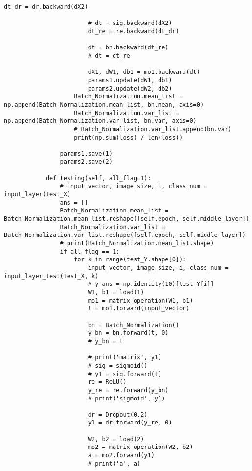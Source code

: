 \documentclass[a4j, titlepage]{jarticle}
\begin{document}
\begin{lstlisting}[caption=3層ニューラルネットワークの構成 ,label=fuga]
                        dt_dr = dr.backward(dX2)

                        # dt = sig.backward(dX2)
                        dt_re = re.backward(dt_dr)

                        dt = bn.backward(dt_re)
                        # dt = dt_re

                        dX1, dW1, db1 = mo1.backward(dt)
                        params1.update(dW1, db1)
                        params2.update(dW2, db2)
                    Batch_Normalization.mean_list = np.append(Batch_Normalization.mean_list, bn.mean, axis=0)
                    Batch_Normalization.var_list = np.append(Batch_Normalization.var_list, bn.var, axis=0)
                    # Batch_Normalization.var_list.append(bn.var)
                    print(np.sum(loss) / len(loss))

                params1.save(1)
                params2.save(2)

            def testing(self, all_flag=1):
                # input_vector, image_size, i, class_num = input_layer(test_X)
                ans = []
                Batch_Normalization.mean_list = Batch_Normalization.mean_list.reshape([self.epoch, self.middle_layer])
                Batch_Normalization.var_list = Batch_Normalization.var_list.reshape([self.epoch, self.middle_layer])
                # print(Batch_Normalization.mean_list.shape)
                if all_flag == 1:
                    for k in range(test_Y.shape[0]):
                        input_vector, image_size, i, class_num = input_layer_test(test_X, k)
                        # y_ans = np.identity(10)[test_Y[i]]
                        W1, b1 = load(1)
                        mo1 = matrix_operation(W1, b1)
                        t = mo1.forward(input_vector)

                        bn = Batch_Normalization()
                        y_bn = bn.forward(t, 0)
                        # y_bn = t

                        # print('matrix', y1)
                        # sig = sigmoid()
                        # y1 = sig.forward(t)
                        re = ReLU()
                        y_re = re.forward(y_bn)
                        # print('sigmoid', y1)

                        dr = Dropout(0.2)
                        y1 = dr.forward(y_re, 0)

                        W2, b2 = load(2)
                        mo2 = matrix_operation(W2, b2)
                        a = mo2.forward(y1)
                        # print('a', a)


\end{lstlisting}
\end{document}
